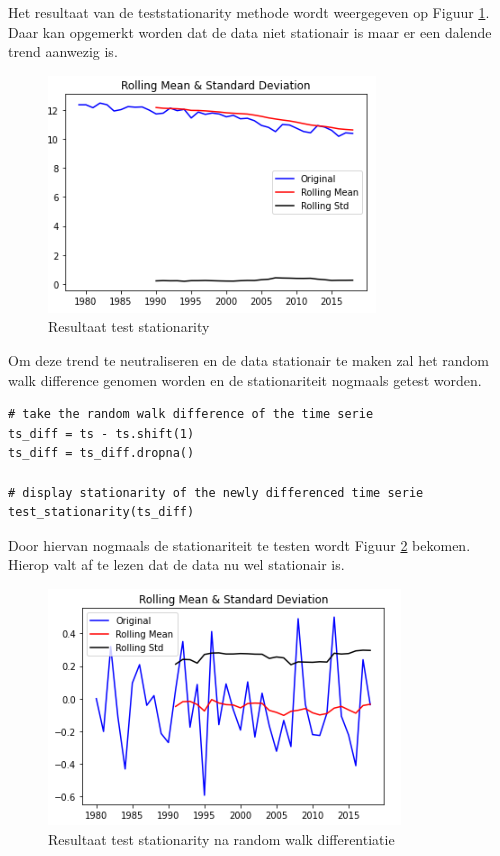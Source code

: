 Het resultaat van de test\textunderscore stationarity methode wordt weergegeven op Figuur \ref{fig:stationarityunivariatenonseasonal}. Daar kan opgemerkt worden dat de data niet stationair is maar er een dalende trend aanwezig is.

\begin{figure}[!h]
    \centering
    \caption{Resultaat test stationarity}
    \label{fig:stationarityunivariatenonseasonal}
    \includegraphics[width=0.7\linewidth]{stationarity_univariate_non_seasonal}
\end{figure}

Om deze trend te neutraliseren en de data stationair te maken zal het random walk difference genomen worden en de stationariteit nogmaals getest worden.\\


\begin{verbatim}
# take the random walk difference of the time serie
ts_diff = ts - ts.shift(1)
ts_diff = ts_diff.dropna()

# display stationarity of the newly differenced time serie
test_stationarity(ts_diff)
\end{verbatim}

Door hiervan nogmaals de stationariteit te testen wordt Figuur \ref{fig:stationarityunivariatenonseasonal2} bekomen. Hierop valt af te lezen dat de data nu wel stationair is.

\begin{figure}[!h]
    \centering
    \caption{Resultaat test stationarity na random walk differentiatie}
    \label{fig:stationarityunivariatenonseasonal2}
    \includegraphics[width=0.7\linewidth]{stationarity_univariate_non_seasonal2}
\end{figure}

